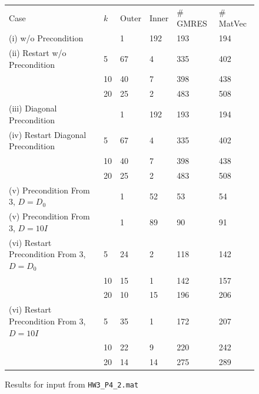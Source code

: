\begin{enumerate}
\begin{figure}[tbh]
 \centering    
\begin{tabular}{ |p{6cm}|| p{1cm}|p{1.5cm}|p{1.5cm}|p{1.8cm}|p{1.7cm}|}
 \hline
Case & $k$ & Outer  & Inner &  \# GMRES  &\#  MatVec \\ \hhline{|=|=|=|=|=|=|}
 \hline
 (i) w/o Precondition                        &   &  1 & 192  & 193  & 194  \\
  \hline
 (ii) Restart w/o Precondition               & 5  & 67 & 4 & 335 & 402  \\                              
                                             & 10 & 40 & 7 & 398 & 438 \\
                                             & 20 & 25 & 2 & 483 & 508 \\                               
 \hline
(iii) Diagonal Precondition                  &   & 1 & 192 & 193 & 194 \\                              
 \hline
(iv) Restart Diagonal Precondition           & 5 & 67  & 4 & 335 & 402  \\                              
                                             & 10 & 40 & 7 & 398 & 438 \\
                                             & 20 & 25 & 2 & 483  & 508  \\
 \hline
(v) Precondition From 3, $D=D_{0}$           &   & 1 & 52 & 53 & 54 \\                              
 \hline
(v) Precondition From 3, $D=10I$             &   & 1 & 89 & 90 & 91  \\                              
 \hline
(vi) Restart Precondition From 3, $D=D_{0}$  & 5  & 24 & 2  & 118 & 142  \\                              
                                             & 10 & 15 & 1  & 142 & 157 \\
                                             & 20 & 10 & 15 & 196 & 206 \\
\hline
(vi) Restart Precondition From 3, $D=10I$    & 5  & 35 & 1 & 172 & 207  \\                              
                                             & 10 & 22 & 9 & 220 & 242  \\
                                             & 20 & 14 & 14& 275 & 289 \\
 \hline
\end{tabular} 
\caption{Results for input from \texttt{HW3_P4_2.mat}}
   \label{tab:mat2}
\end{figure} 


\end{enumerate}
